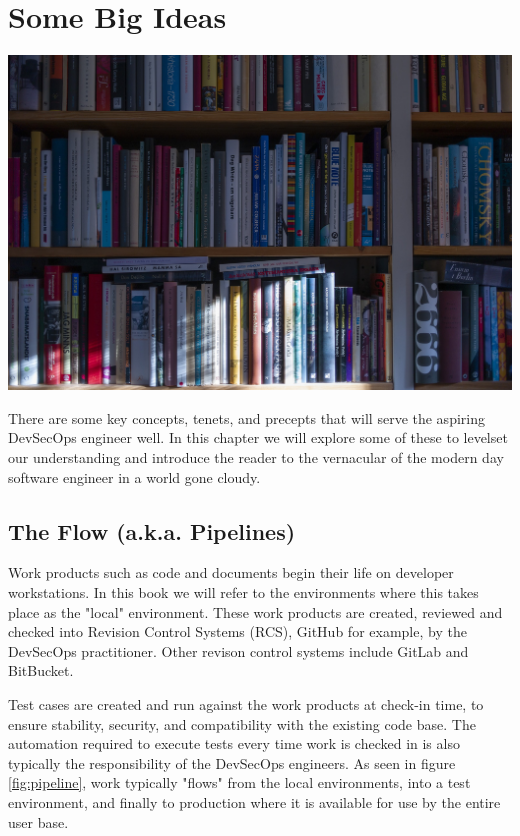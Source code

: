 \chapter{Some Big Ideas}

\includegraphics[scale=0.85]{../images/book-5104342_1920.jpg}

\justify
There are some key concepts, tenets, and precepts that will serve the aspiring DevSecOps engineer well. In this chapter we will explore some of these to levelset our understanding and introduce the reader to the vernacular of the modern day software engineer in a world gone cloudy.

\section{The Flow (a.k.a. Pipelines)}

\justify
Work products such as code and documents begin their life on developer workstations. In this book we will refer to the environments where this takes place as the "local" environment. These work products are created, reviewed and checked into Revision Control Systems (RCS), GitHub for example, by the DevSecOps practitioner. Other revison control systems include GitLab and BitBucket.

\justify
Test cases are created and run against the work products at check-in time, to ensure stability, security, and compatibility with the existing code base. The automation required to execute tests every time work is checked in is also typically the responsibility of the DevSecOps engineers. As seen in figure \ref{fig:pipeline}, work typically "flows" from the local environments, into a test environment, and finally to production where
it is available for use by the entire user base.

